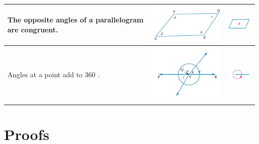 \documentclass{book}
\begin{document}
\begin{center}
\begin{tabular}{|p{5cm}|p{6cm}|p{2cm}|}
		The opposite angles of a parallelogram are congruent.           & \includegraphics[width=6cm]{geometry theorem 10} & \includegraphics[width=2cm]{geometry theorem 10 symbol} \\ \hline
		Angles at a point add to 360 \degree.                           & \includegraphics[width=6cm]{geometry theorem 11} & \includegraphics[width=2cm]{geometry theorem 11 symbol} \\ \hline
	\end{tabular}
\end{center}


\chapter{Proofs}
\end{document}
